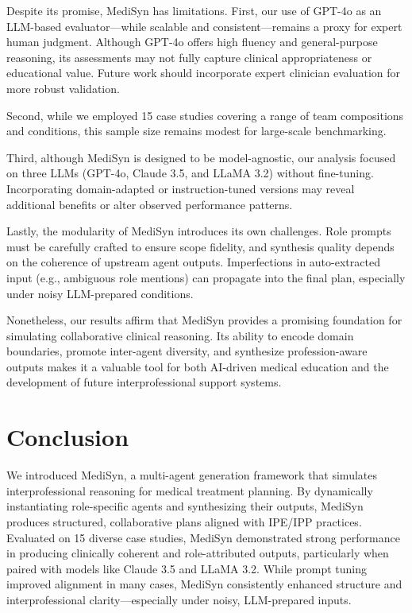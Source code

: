 \documentclass[pdflatex,sn-mathphys-num]{sn-jnl}%
\theoremstyle{thmstyleone}%
\theoremstyle{thmstyletwo}%
\theoremstyle{thmstylethree}%
\begin{document}
Despite its promise, MediSyn has limitations. First, our use of GPT-4o as an LLM-based evaluator—while scalable and consistent—remains a proxy for expert human judgment. Although GPT-4o offers high fluency and general-purpose reasoning, its assessments may not fully capture clinical appropriateness or educational value. Future work should incorporate expert clinician evaluation for more robust validation.

Second, while we employed 15 case studies covering a range of team compositions and conditions, this sample size remains modest for large-scale benchmarking.

Third, although MediSyn is designed to be model-agnostic, our analysis focused on three LLMs (GPT-4o, Claude 3.5, and LLaMA 3.2) without fine-tuning. Incorporating domain-adapted or instruction-tuned versions may reveal additional benefits or alter observed performance patterns.

Lastly, the modularity of MediSyn introduces its own challenges. Role prompts must be carefully crafted to ensure scope fidelity, and synthesis quality depends on the coherence of upstream agent outputs. Imperfections in auto-extracted input (e.g., ambiguous role mentions) can propagate into the final plan, especially under noisy LLM-prepared conditions.

Nonetheless, our results affirm that MediSyn provides a promising foundation for simulating collaborative clinical reasoning. Its ability to encode domain boundaries, promote inter-agent diversity, and synthesize profession-aware outputs makes it a valuable tool for both AI-driven medical education and the development of future interprofessional support systems.


\section{Conclusion}\label{sec6}
We introduced MediSyn, a multi-agent generation framework that simulates interprofessional reasoning for medical treatment planning. By dynamically instantiating role-specific agents and synthesizing their outputs, MediSyn produces structured, collaborative plans aligned with IPE/IPP practices. Evaluated on 15 diverse case studies, MediSyn demonstrated strong performance in producing clinically coherent and role-attributed outputs, particularly when paired with models like Claude 3.5 and LLaMA 3.2. While prompt tuning improved alignment in many cases, MediSyn consistently enhanced structure and interprofessional clarity—especially under noisy, LLM-prepared inputs.
\end{document}
